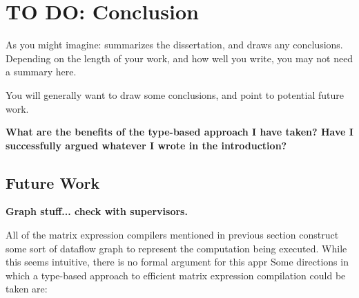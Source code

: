 \chapter{TO DO: Conclusion}

\begin{guidance}
    As you might imagine: summarizes the dissertation, and draws
    any conclusions. Depending on the length of your work, and
    how well you write, you may not need a summary here.

    You will generally want to draw some conclusions, and point
    to potential future work.
\end{guidance}

\textbf{What are the benefits of the type-based approach I have taken? Have I successfully 
argued whatever I wrote in the introduction?}

\section{Future Work}


\textbf{Graph stuff... check with supervisors.}

All of the matrix expression compilers mentioned in previous section construct
some sort of dataflow graph to represent the computation being executed. While
this seems intuitive, there is no formal argument for this  appr
Some directions in which a type-based approach to efficient matrix expression compilation could
be taken are:

